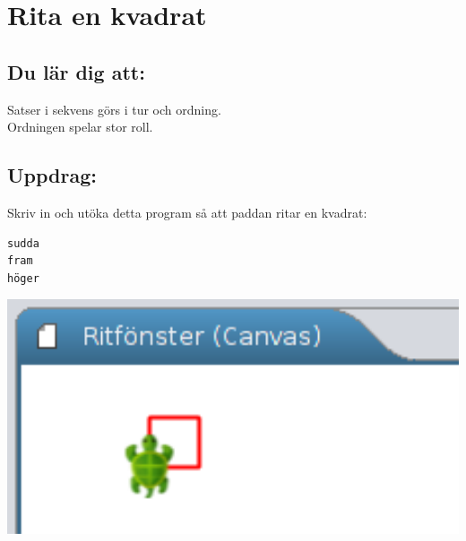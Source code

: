 \chapter{Rita en kvadrat}
\begin{multicols}{2}
\section*{\color{MidnightBlue}Du lär dig att:}
Satser i sekvens görs i tur och ordning.\\
Ordningen spelar stor roll.
\section*{\color{BrickRed}Uppdrag:}
Skriv in och utöka detta program så att paddan ritar en kvadrat:

\begin{lstlisting}[basicstyle={\ttfamily\fontsize{24}{24}\selectfont}]
sudda
fram
höger
\end{lstlisting}
        

\columnbreak

\includegraphics[width=14cm]{../img/kvadrat.png}
\end{multicols}

